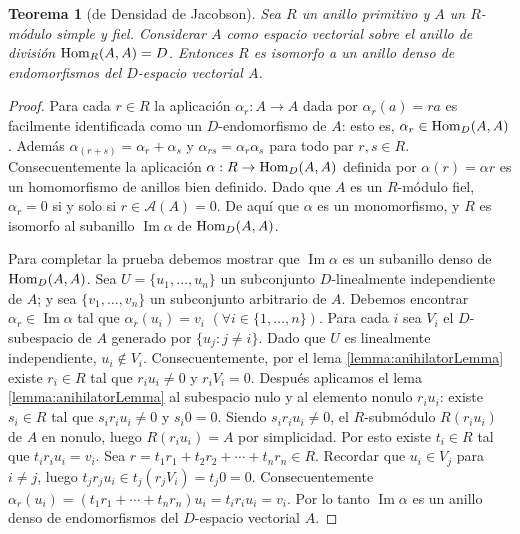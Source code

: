 \documentclass{report}
\newcommand{\Hom}{\textnormal{Hom}}
\DeclareMathOperator{\image}{\text{Im}}
\newtheorem{theorem}{Teorema}
\begin{document}
  \begin{theorem}[de Densidad de Jacobson]
    \label{theorem:jacobsonDensityTheorem}
    Sea \(R\) un anillo primitivo y \(A\) un \(R\)-módulo simple y fiel.
    Considerar \(A\) como espacio vectorial sobre el anillo de división \(\Hom_R(A, A) = D\).
    Entonces \(R\) es isomorfo a un anillo denso de endomorfismos del \(D\)-espacio vectorial \(A\).
  \end{theorem}
  \begin{proof}
    Para cada \(r \in R\) la aplicación \(\alpha_r : A \rightarrow A\) dada por \(\alpha_r(a) = r a\) es facilmente identificada como un \(D\)-endomorfismo de \(A\): esto es, \(\alpha_r \in \Hom_D(A, A)\).
    Además \(\alpha_{(r + s)} = \alpha_r + \alpha_s\) y \(\alpha_{r s} = \alpha_r \alpha_s\) para todo par \(r, s \in R\).
    Consecuentemente la aplicación \(\alpha : R \rightarrow \Hom_D(A, A)\) definida por \(\alpha(r) = \alpha r\) es un homomorfismo de anillos bien definido.
    Dado que \(A\) es un \(R\)-módulo fiel, \(\alpha_r = 0\) si y solo si \(r \in \mathcal{A}(A) = 0\).
    De aquí que \(\alpha\) es un monomorfismo, y \(R\) es isomorfo al subanillo \(\image \alpha\) de \(\Hom_D(A, A)\).

    Para completar la prueba debemos mostrar que \(\image \alpha\) es un subanillo denso de \(\Hom_D(A, A)\).
    Sea \(U = \{u_1, \dots, u_n\}\) un subconjunto \(D\)-linealmente independiente de \(A\); y sea \(\{v_1, \dots, v_n\}\) un subconjunto arbitrario de \(A\).
    Debemos encontrar \(\alpha_r \in \image \alpha\) tal que \(\alpha_r(u_i) = v_i\) \((\forall i \in \{1, \dots, n\})\).
    Para cada \(i\) sea \(V_i\) el \(D\)-subespacio de \(A\) generado por \(\{u_j : j \neq i\}\).
    Dado que \(U\) es linealmente independiente, \(u_i \notin V_i\).
    Consecuentemente, por el lema \ref{lemma:anihilatorLemma} existe \(r_i \in R\) tal que \(r_i u_i \neq 0\) y \(r_i V_i = 0\).
    Después aplicamos el lema \ref{lemma:anihilatorLemma} al subespacio nulo y al elemento nonulo \(r_i u_i\):
    existe \(s_i \in R\) tal que \(s_i r_i u_i \neq 0\) y \(s_i 0 = 0\).
    Siendo \(s_i r_i u_i \neq 0\), el \(R\)-submódulo \(R (r_i u_i)\) de \(A\) en nonulo, luego \(R (r_i u_i) = A\) por simplicidad.
    Por esto existe \(t_i \in R\) tal que \(t_i r_i u_i = v_i\).
    Sea \(r = t_1 r_1 + t_2 r_2 + \cdots + t_n r_n \in R\).
    Recordar que \(u_i \in V_j\) para \(i \neq j\), luego \(t_j r_j u_i \in t_j (r_j V_i) = t_j 0 = 0\).
    Consecuentemente \(\alpha_r(u_i) = (t_1 r_1 + \cdots + t_n r_n) u_i = t_i r_i u_i = v_i\).
    Por lo tanto \(\image \alpha\) es un anillo denso de endomorfismos del \(D\)-espacio vectorial \(A\).
  \end{proof}
\end{document}
